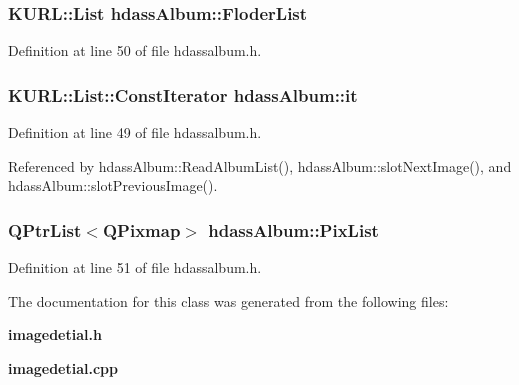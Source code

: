 \subsubsection{\setlength{\rightskip}{0pt plus 5cm}KURL::List {\bf hdass\-Album::Floder\-List}\hspace{0.3cm}{\tt  [inherited]}}\label{classhdassAlbum_ImageDetialo2}




Definition at line 50 of file hdassalbum.h.
\subsubsection{\setlength{\rightskip}{0pt plus 5cm}KURL::List::Const\-Iterator {\bf hdass\-Album::it}\hspace{0.3cm}{\tt  [inherited]}}\label{classhdassAlbum_ImageDetialo0}




Definition at line 49 of file hdassalbum.h.

Referenced by hdass\-Album::Read\-Album\-List(), hdass\-Album::slot\-Next\-Image(), and hdass\-Album::slot\-Previous\-Image().
\subsubsection{\setlength{\rightskip}{0pt plus 5cm}QPtr\-List$<$QPixmap$>$ {\bf hdass\-Album::Pix\-List}\hspace{0.3cm}{\tt  [inherited]}}\label{classhdassAlbum_ImageDetialo3}




Definition at line 51 of file hdassalbum.h.

The documentation for this class was generated from the following files:\begin{CompactItemize}
\item 
{\bf imagedetial.h}\item 
{\bf imagedetial.cpp}\end{CompactItemize}
